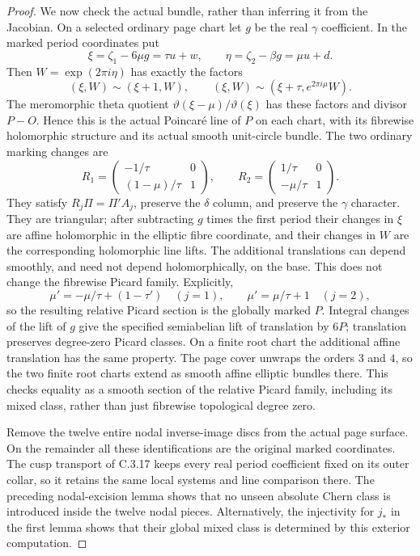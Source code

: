 \begin{proof}
We now check the actual bundle, rather than inferring it from
the Jacobian.  On a selected ordinary page chart let $g$ be
the real $\gamma$ coefficient.  In the marked period coordinates
put
\[
 \xi=\zeta_1-6\mu g=\tau u+w,
 \qquad \eta=\zeta_2-\beta g=\mu u+d.
\]
Then $W=\exp(2\pi i\eta)$ has exactly the factors
\[
 (\xi,W)\sim(\xi+1,W),\qquad
 (\xi,W)\sim(\xi+\tau,e^{2\pi i\mu}W).
\]
The meromorphic theta quotient
$\vartheta(\xi-\mu)/\vartheta(\xi)$ has these factors and divisor
$P-O$.  Hence this is the actual Poincar\'e line of $P$ on each
chart, with its fibrewise holomorphic structure and its actual
smooth unit-circle bundle.  The two ordinary marking changes are
\[
 R_1=\begin{pmatrix}-1/\tau&0\\(1-\mu)/\tau&1\end{pmatrix},
 \qquad
 R_2=\begin{pmatrix}1/\tau&0\\-\mu/\tau&1\end{pmatrix}.
\]
They satisfy $R_j\Pi=\Pi' A_j$, preserve the $\delta$ column,
and preserve the $\gamma$ character.  They are triangular;
after subtracting $g$ times the first period their changes in
$\xi$ are affine holomorphic in the elliptic fibre coordinate,
and their changes in $W$ are the corresponding holomorphic
line lifts.  The additional translations can depend smoothly,
and need not depend holomorphically, on the base.  This does
not change the fibrewise Picard family.  Explicitly,
\[
 \mu'=-\mu/\tau+(1-\tau')\quad(j=1),
 \qquad \mu'=\mu/\tau+1\quad(j=2),
\]
so the resulting relative Picard section is the globally marked
$P$.  Integral changes of the lift of $g$ give the specified
semiabelian lift of translation by $6P$; translation preserves
degree-zero Picard classes.  On a finite root chart the additional
affine translation has the same property.  The page cover unwraps
the orders $3$ and $4$, so the two finite root charts extend as
smooth affine elliptic bundles there.  This checks equality as
a smooth section of the relative Picard family, including its
mixed class, rather than just fibrewise topological degree zero.

Remove the twelve entire nodal inverse-image discs from the
actual page surface.  On the remainder all these identifications
are the original marked coordinates.  The cusp transport of
C.3.17 keeps every real period coefficient fixed on its outer
collar, so it retains the same local systems and line comparison
there.  The preceding nodal-excision lemma shows that no
unseen absolute Chern class is introduced inside the twelve
nodal pieces.  Alternatively, the injectivity for $j_*$ in the
first lemma shows that their global mixed class is determined
by this exterior computation.


\end{proof}
